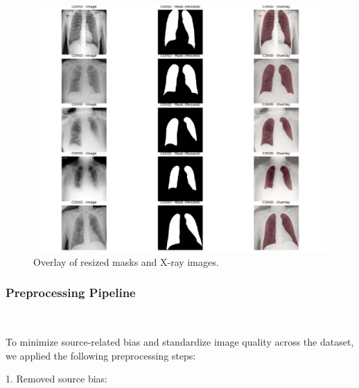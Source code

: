 \documentclass{article}
\begin{document}
\begin{figure}[h!]%
    \centering
    \includegraphics[width=1\linewidth]{overlay_masks_images.png}
    \caption{Overlay of resized masks and X-ray images.}
    \label{fig:overlay_masks_images}
\end{figure}   

\vspace{0.3cm}

\vspace{0.5cm}



\vspace{0.3cm}

\subsubsection{Preprocessing Pipeline}\

\vspace{0.5cm}

To minimize source-related bias and standardize image quality across the dataset, we applied the following preprocessing steps:

\vspace{0.3cm}

1. Removed source bias:
\end{document}
